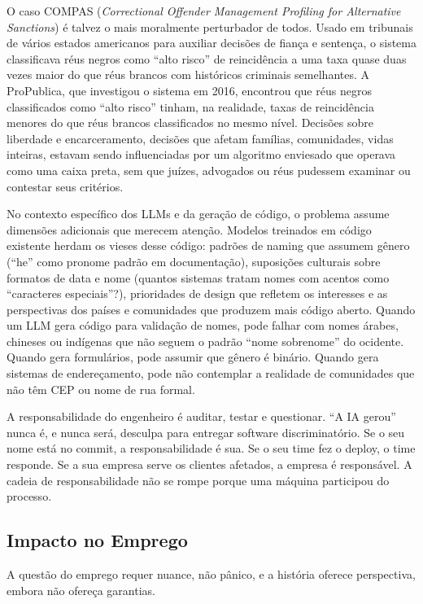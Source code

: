 O caso COMPAS (\textit{Correctional Offender Management Profiling for
Alternative Sanctions}) é talvez o mais moralmente perturbador de
todos. Usado em tribunais de vários estados americanos para auxiliar
decisões de fiança e sentença, o sistema classificava réus negros como
``alto risco'' de reincidência a uma taxa quase duas vezes maior do que
réus brancos com históricos criminais semelhantes. A ProPublica, que
investigou o sistema em 2016, encontrou que réus negros classificados
como ``alto risco'' tinham, na realidade, taxas de reincidência menores
do que réus brancos classificados no mesmo nível. Decisões sobre
liberdade e encarceramento, decisões que afetam famílias, comunidades,
vidas inteiras, estavam sendo influenciadas por um algoritmo
enviesado que operava como uma caixa preta, sem que juízes, advogados
ou réus pudessem examinar ou contestar seus critérios.

No contexto específico dos LLMs e da geração de código, o problema
assume dimensões adicionais que merecem atenção. Modelos treinados em
código existente herdam os vieses desse código: padrões de naming que
assumem gênero (``he'' como pronome padrão em documentação), suposições
culturais sobre formatos de data e nome (quantos sistemas tratam nomes
com acentos como ``caracteres especiais''?), prioridades de design que
refletem os interesses e as perspectivas dos países e comunidades que
produzem mais código aberto. Quando um LLM gera código para validação
de nomes, pode falhar com nomes árabes, chineses ou indígenas que não
seguem o padrão ``nome sobrenome'' do ocidente. Quando gera formulários,
pode assumir que gênero é binário. Quando gera sistemas de
endereçamento, pode não contemplar a realidade de comunidades que não
têm CEP ou nome de rua formal.

A responsabilidade do engenheiro é auditar, testar e questionar.
``A IA gerou'' nunca é, e nunca será, desculpa para entregar software
discriminatório. Se o seu nome está no commit, a responsabilidade é sua.
Se o seu time fez o deploy, o time responde. Se a sua empresa serve os
clientes afetados, a empresa é responsável. A cadeia de responsabilidade
não se rompe porque uma máquina participou do processo.

\subsection{Impacto no Emprego}

A questão do emprego requer nuance, não pânico, e a história oferece
perspectiva, embora não ofereça garantias.

